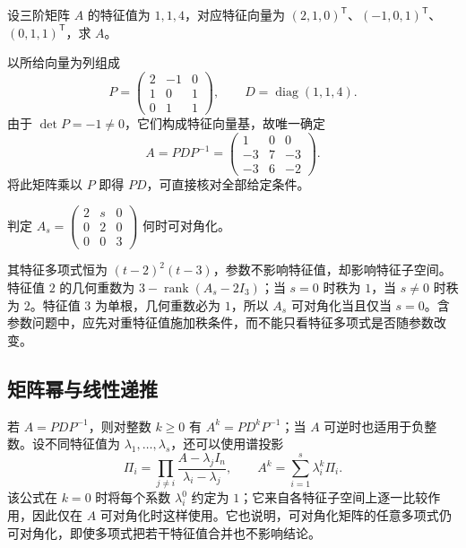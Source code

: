 \begin{example}
设三阶矩阵 $A$ 的特征值为 $1,1,4$，对应特征向量为 $(2,1,0)^{\mathsf T}$、$(-1,0,1)^{\mathsf T}$、$(0,1,1)^{\mathsf T}$，求 $A$。
\end{example}
\begin{solve}
以所给向量为列组成
\[
P=\begin{pmatrix}2&-1&0\\1&0&1\\0&1&1\end{pmatrix},\qquad
D=\operatorname{diag}(1,1,4).
\]
由于 $\det P=-1\ne0$，它们构成特征向量基，故唯一确定
\[
A=PDP^{-1}=\begin{pmatrix}1&0&0\\-3&7&-3\\-3&6&-2\end{pmatrix}.
\]
将此矩阵乘以 $P$ 即得 $PD$，可直接核对全部给定条件。
\end{solve}

\begin{example}
判定 $A_s=\begin{pmatrix}2&s&0\\0&2&0\\0&0&3\end{pmatrix}$ 何时可对角化。
\end{example}
\begin{solve}
其特征多项式恒为 $(t-2)^2(t-3)$，参数不影响特征值，却影响特征子空间。特征值 $2$ 的几何重数为 $3-\operatorname{rank}(A_s-2I_3)$；当 $s=0$ 时秩为 $1$，当 $s\ne0$ 时秩为 $2$。特征值 $3$ 为单根，几何重数必为 $1$，所以 $A_s$ 可对角化当且仅当 $s=0$。含参数问题中，应先对重特征值施加秩条件，而不能只看特征多项式是否随参数改变。
\end{solve}

\subsection{矩阵幂与线性递推}

若 $A=PDP^{-1}$，则对整数 $k\ge0$ 有 $A^k=PD^kP^{-1}$；当 $A$ 可逆时也适用于负整数。设不同特征值为 $\lambda_1,\ldots,\lambda_s$，还可以使用谱投影
\begin{equation}
\Pi_i=\prod_{j\ne i}\frac{A-\lambda_jI_n}{\lambda_i-\lambda_j},\qquad
A^k=\sum_{i=1}^s\lambda_i^k\Pi_i.
\label{eq:xie-ex-eig-spectral-projections}
\end{equation}
该公式在 $k=0$ 时将每个系数 $\lambda_i^0$ 约定为 $1$；它来自各特征子空间上逐一比较作用，因此仅在 $A$ 可对角化时这样使用。它也说明，可对角化矩阵的任意多项式仍可对角化，即使多项式把若干特征值合并也不影响结论。

